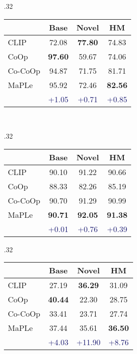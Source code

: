 \documentclass[10pt,twocolumn,letterpaper]{article}
\begin{document}
\begin{table*}[t!]
\begin{subtable}[t]{.32\textwidth}
\begin{tabular}{l cc|c}
    & Base & Novel & HM \\
    \midrule
    CLIP & 72.08 & \textbf{77.80} & 74.83 \\
    CoOp & \textbf{97.60} & 59.67 & 74.06 \\
    Co-CoOp & 94.87 & 71.75 & {81.71} \\
    \midrule
        \rowcolor{tabhighlight}
    MaPLe & 95.92 & 72.46 & \textbf{82.56} \\
     &  \textcolor{MidnightBlue}{{+1.05}} &  \textcolor{MidnightBlue}{{+0.71}} &  \textcolor{MidnightBlue}{{+0.85}} \\
    \bottomrule
    \end{tabular}
    \end{subtable}
    ~
    \begin{subtable}[t]{.32\textwidth}
    \centering
    \caption{Food101}
    \begin{tabular}{l cc|c}
    \toprule
    & Base & Novel & HM \\
    \midrule
    CLIP & 90.10 & 91.22 & 90.66 \\
    CoOp & 88.33 & 82.26 & 85.19 \\
    Co-CoOp & {90.70} & {91.29} & {90.99} \\
    \midrule
        \rowcolor{tabhighlight}
    MaPLe & \textbf{90.71} & \textbf{92.05} & \textbf{91.38} \\
     &  \textcolor{MidnightBlue}{{+0.01}} &  \textcolor{MidnightBlue}{{+0.76}} &  \textcolor{MidnightBlue}{{+0.39}} \\
    \bottomrule
    \end{tabular}
    \end{subtable}
    \vspace{1em}
    \begin{subtable}[t]{.32\textwidth}
    \centering
    \caption{FGVCAircraft}
    \begin{tabular}{l cc|c}
    \toprule
    & Base & Novel & HM \\
    \midrule
    CLIP & 27.19 & \textbf{36.29} & {31.09} \\
    CoOp & \textbf{40.44} & 22.30 & 28.75 \\
    Co-CoOp & 33.41 & 23.71 & 27.74 \\
    \midrule
        \rowcolor{tabhighlight}
    MaPLe & 37.44 & 35.61 & \textbf{36.50} \\
      &  \textcolor{MidnightBlue}{{+4.03}} &  \textcolor{MidnightBlue}{{+11.90}} &  \textcolor{MidnightBlue}{{+8.76}} \\
    \bottomrule

\end{tabular}
\end{subtable}
\end{table*}
\end{document}
